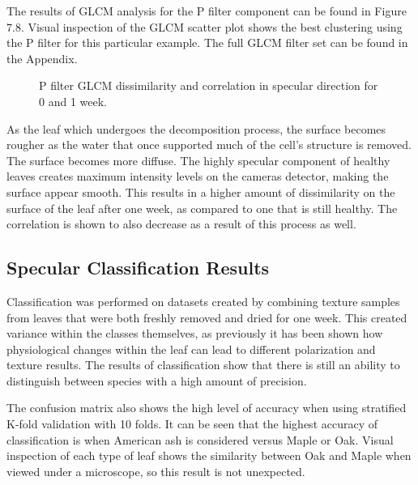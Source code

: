 The results of GLCM analysis for the P filter component can be found in Figure 7.8.  Visual inspection of the GLCM scatter plot shows the best clustering using the P filter for this particular example.  The full GLCM filter set can be found in the Appendix.
%
\begin{sidewaysfigure}
    \begin{center}
    \end{center}
    \caption{P filter GLCM dissimilarity and correlation in specular direction for 0 and 1 week.}
    \label{fig:polarization}
\end{sidewaysfigure}
%
As the leaf which undergoes the decomposition process, the surface becomes rougher as the water that once supported much of the cell's structure is removed. The surface becomes more diffuse.  The highly specular component of healthy leaves creates maximum intensity levels on the cameras detector, making the surface appear smooth.  This results in a higher amount of dissimilarity on the surface of the leaf after one week, as compared to one that is still healthy.  The correlation is shown to also decrease as a result of this process as well.

\subsection{Specular Classification Results}
Classification was performed on datasets created by combining texture samples from leaves that were both freshly removed and dried for one week.  This created variance within the classes themselves, as previously it has been shown how physiological changes within the leaf can lead to different polarization and texture results.  The results of classification show that there is still an ability to distinguish between species with a high amount of precision.

The confusion matrix also shows the high level of accuracy when using stratified K-fold validation with 10 folds.  It can be seen that the highest accuracy of classification is when American ash is considered versus Maple or Oak.  Visual inspection of each type of leaf shows the similarity between Oak and Maple when viewed under a microscope, so this result is not unexpected.


